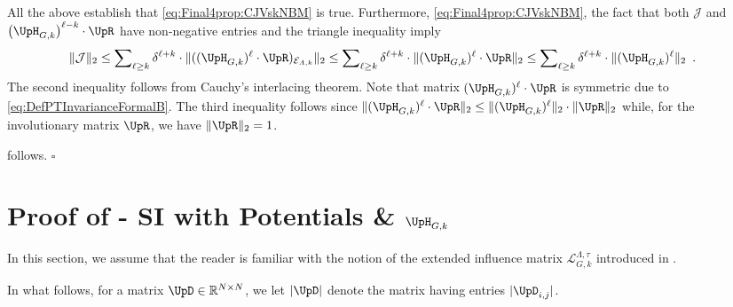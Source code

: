 \documentclass[11pt,reqno]{amsart}
\numberwithin{equation}{section}
\newcommand{\cE}{{\mathcal{E}}}
\newcommand{\cL}{{\mathcal{L}}}
\newcommand{\applegreen}[1]{ {\color{applegreen}#1}}
\newcommand{\blue}[1]{{\color{blue}#1}}
\newcommand{\bluepigment}[1]{{\color{blue(pigment)}#1}}
\newcommand{\cadmiumgreen}[1]{{\color{cadmiumgreen}#1}}
\newcommand{\goldenbrown}[1]{{\color{goldenbrown}#1}}
\newcommand{\iris}[1]{{\color{iris}#1}}
\newcommand{\ExtV}{\iris{\cE}}
\newcommand{\norm}[2]{\goldenbrown{\|} #1 \goldenbrown{\|}_{#2}}
\newcommand{\abs}[1]{\blue{|}#1\blue{|}}
\newcommand{\NBMatrix}{\cadmiumgreen{\UpH}_{G,\kk}}
\newcommand{\Invol}{\UpR}
\newcommand{\spreadpoint}{\newpage}
\newcommand{\LastReviewG}[1]{{\color{magenta}\hspace{.2cm} [Rev: \textrm{#1} - \bluepigment{G} ] \hspace{.2cm}}}
\renewcommand{\LastReviewG}[1]{}
\renewcommand{\spreadpoint}{}
\renewcommand{\applegreen}[1]{#1}
\renewcommand{\blue}[1]{#1}
\renewcommand{\bluepigment}[1]{#1}
\renewcommand{\cadmiumgreen}[1]{#1}
\renewcommand{\goldenbrown}[1]{#1}
\renewcommand{\iris}[1]{#1}
\newcommand{\kk}{\bluepigment{k}}
\newcommand{\kell}{{\color{green(pigment)}\ell}}%
\renewcommand{\kk}{k}
\renewcommand{\kell}{\ell}
\newcommand{\infmatrixB}{\mathcal{J}}
\newcommand{\ExtdInfMatrixF}{\applegreen{\cL}^{\Lambda,\tau}_{G,\kk}}
\begin{document}
All the above establish that \eqref{eq:Final4prop:CJVskNBM} is true. Furthermore, \eqref{eq:Final4prop:CJVskNBM}, 
the fact that both $\infmatrixB$  and $\left( \NBMatrix\right)^{\kell-\kk}\cdot \Invol$ have non-negative entries and the 
triangle inequality imply
\begin{align}\nonumber
\norm{ \infmatrixB}{2} &
\leq \sum\nolimits_{\kell\geq \kk}\delta^{\kell+\kk}\cdot \norm{ (( \NBMatrix)^{\kell} \cdot \Invol )_{\ExtV_{\Lambda, \kk}}}2 
\leq \sum\nolimits_{\kell\geq \kk}\delta^{\kell+\kk}\cdot \norm{ ( \NBMatrix)^{\kell} \cdot \Invol }{2} 
\leq \sum\nolimits_{\kell\geq \kk}\delta^{\kell+\kk}\cdot \norm{ ( \NBMatrix)^{\kell} }{2} \enspace. \nonumber
\end{align}
The second inequality follows from Cauchy’s  interlacing theorem. Note that   matrix $(\NBMatrix)^{\kell} \cdot \Invol$ is symmetric 
due to \eqref{eq:DefPTInvarianceFormalB}.
 The third inequality follows since $\norm{ ( \NBMatrix)^{\kell} \cdot \Invol }{2}\leq \norm{ ( \NBMatrix)^{\kell}}{2}\cdot \norm{ \Invol }{2}$ while, for the involutionary matrix $\Invol$,  
we have $\norm{ \Invol}{2}=1$.

 follows.  \hfill $\square$


 




\spreadpoint

\section{Proof of  - SI with Potentials \& $\NBMatrix$ \LastReviewG{2025-04-02}}
\label{sec:thrm:NonBacktrackingPotentialSpIn}

In this section, we assume that the reader is familiar with the notion of the extended influence matrix $\ExtdInfMatrixF$
 introduced in . 


In what follows, for a matrix $\UpD \in \mathbb{R}^{ N \times N}$, we let $\abs{\UpD}$ denote the matrix having entries $\abs{\UpD_{i,j}}$.
\end{document}
